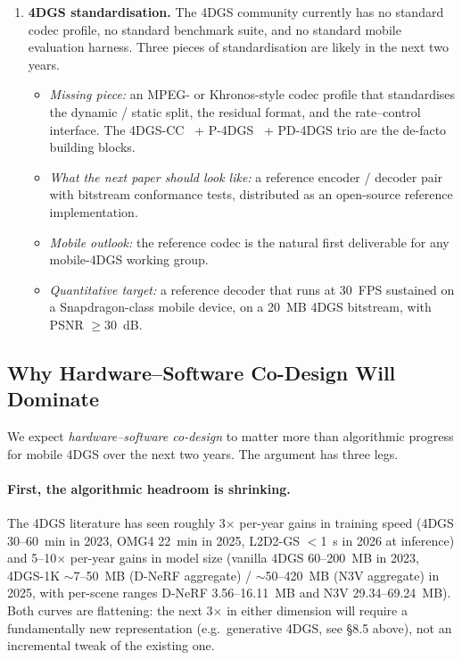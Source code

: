 \begin{enumerate}
  \item \textbf{4DGS standardisation.} The 4DGS community
        currently has no standard codec profile, no standard
        benchmark suite, and no standard mobile evaluation
        harness. Three pieces of standardisation are likely
        in the next two years.
        \begin{itemize}
        \item \textit{Missing piece:} an MPEG- or
              Khronos-style codec profile that standardises the
              dynamic / static split, the residual format, and
              the rate--control interface. The
              4DGS-CC~\cite{chen20254dgscc} + P-4DGS~\cite{wang2025p4dgs}
              + PD-4DGS trio are the de-facto building
              blocks.
        \item \textit{What the next paper should look like:} a
              reference encoder / decoder pair with bitstream
              conformance tests, distributed as an open-source
              reference implementation.
        \item \textit{Mobile outlook:} the reference codec
              is the natural first deliverable for any
              mobile-4DGS working group.
        \item \textit{Quantitative target:} a reference
              decoder that runs at 30~FPS sustained on a
              Snapdragon-class mobile device, on a 20~MB 4DGS
              bitstream, with PSNR $\ge 30$~dB.
        \end{itemize}
\end{enumerate}

\subsection{Why Hardware--Software Co-Design Will Dominate}
We expect \emph{hardware--software co-design} to matter more than
algorithmic progress for mobile 4DGS over the next two years. The
argument has three legs.

\paragraph{First, the algorithmic headroom is shrinking.}
The 4DGS literature has seen roughly 3$\times$ per-year gains in
training speed (4DGS 30--60~min in 2023, OMG4 22~min in 2025,
L2D2-GS $<$1~s in 2026 at inference) and 5--10$\times$ per-year
gains in model size (vanilla 4DGS 60--200~MB in 2023,
4DGS-1K $\sim$7--50~MB (D-NeRF aggregate) / $\sim$50--420~MB
(N3V aggregate) in 2025, with per-scene ranges
D-NeRF 3.56--16.11~MB and N3V 29.34--69.24~MB).
Both curves are flattening: the next 3$\times$ in either dimension
will require a fundamentally new representation (e.g.\ generative
4DGS, see \S8.5 above), not an incremental tweak of the existing
one.

